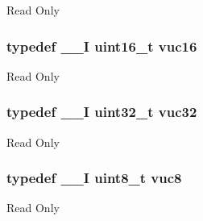 Read Only \hypertarget{group___exported__types_ga7f6037565f0caa27727c8b871daf0d56}{
\subsubsection[{vuc16}]{\setlength{\rightskip}{0pt plus 5cm}typedef \-\_\-\-\_\-\-I uint16\-\_\-t {\bf vuc16}}}\label{group___exported__types_ga7f6037565f0caa27727c8b871daf0d56}
Read Only \hypertarget{group___exported__types_ga2e08e321a35a55e72c5b3a507e76371f}{
\subsubsection[{vuc32}]{\setlength{\rightskip}{0pt plus 5cm}typedef \-\_\-\-\_\-\-I uint32\-\_\-t {\bf vuc32}}}\label{group___exported__types_ga2e08e321a35a55e72c5b3a507e76371f}
Read Only \hypertarget{group___exported__types_gab0ec90ac9b2c5864755998c8d37c264a}{
\subsubsection[{vuc8}]{\setlength{\rightskip}{0pt plus 5cm}typedef \-\_\-\-\_\-\-I uint8\-\_\-t {\bf vuc8}}}\label{group___exported__types_gab0ec90ac9b2c5864755998c8d37c264a}
Read Only 